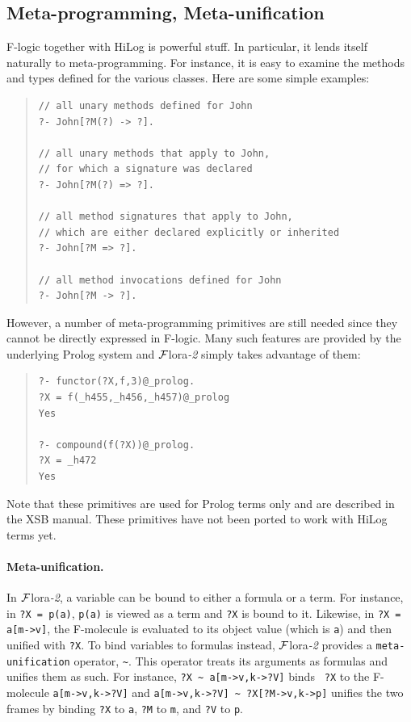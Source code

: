 \documentclass[11pt]{article}
\newcommand{\FLORA}{{\mbox{\sc ${\cal F}${lora}\rm\emph{-2}}}\xspace}
\newcommand{\fl}{\mbox{F-logic}\xspace}
\begin{document}
\subsection{Meta-programming, Meta-unification}
\label{sec-meta-reification}


%
\fl together with HiLog is powerful stuff. In particular, it lends itself
naturally to meta-programming. For instance, it is easy to examine the
methods and types defined for the various classes.  Here are some simple
examples:
\begin{quote}
\begin{verbatim}
// all unary methods defined for John
?- John[?M(?) -> ?].

// all unary methods that apply to John,
// for which a signature was declared
?- John[?M(?) => ?].

// all method signatures that apply to John,
// which are either declared explicitly or inherited
?- John[?M => ?].

// all method invocations defined for John
?- John[?M -> ?].
\end{verbatim}
\end{quote}

However, a number of meta-programming primitives are still needed
since they cannot be directly expressed in \fl. Many such features are
provided by the underlying Prolog system and \FLORA simply takes advantage of
them: 
\begin{quote}
\begin{verbatim}
?- functor(?X,f,3)@_prolog.
?X = f(_h455,_h456,_h457)@_prolog
Yes

?- compound(f(?X))@_prolog.
?X = _h472
Yes
\end{verbatim}
\end{quote}
Note that these primitives are used for Prolog terms only and
are described in the XSB manual. These primitives have not been ported to
work with HiLog terms yet.

\paragraph{Meta-unification.}
In \FLORA, a variable can be bound to either a formula or a term. For instance,
in {\tt ?X = p(a)}, {\tt p(a)} is viewed as a term and {\tt ?X} is bound to
it. Likewise, in {\tt ?X = a[m->v]}, the F-molecule is evaluated to its
object value (which is {\tt a}) and then unified with {\tt ?X}. To bind
variables to formulas instead, \FLORA provides a {\tt meta-unification}
operator, \verb|~|.  This operator treats its arguments as formulas and
unifies them as such. For instance, {\tt ?X \verb|~| a[m->v,k->?V]} binds {\tt
  ?X} to the F-molecule {\tt a[m->v,k->?V]} and {\tt a[m->v,k->?V] \verb|~|
  ?X[?M->v,k->p]} unifies the two frames by binding {\tt ?X} to {\tt a},
{\tt ?M} to {\tt m}, and {\tt ?V} to {\tt p}.
\end{document}
